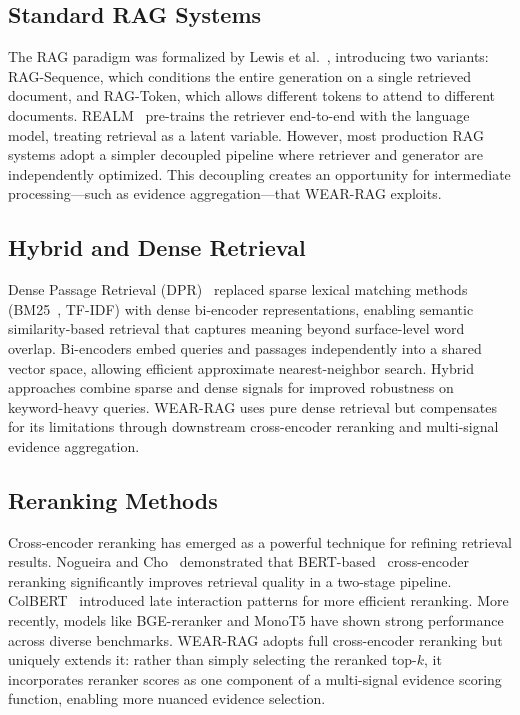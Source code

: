 \documentclass[conference]{IEEEtran}
\begin{document}
\subsection{Standard RAG Systems}
The RAG paradigm was formalized by Lewis et al.~\cite{lewis2020rag}, introducing two variants: RAG-Sequence, which conditions the entire generation on a single retrieved document, and RAG-Token, which allows different tokens to attend to different documents. REALM~\cite{guu2020realm} pre-trains the retriever end-to-end with the language model, treating retrieval as a latent variable. However, most production RAG systems adopt a simpler decoupled pipeline where retriever and generator are independently optimized. This decoupling creates an opportunity for intermediate processing---such as evidence aggregation---that WEAR-RAG exploits.

\subsection{Hybrid and Dense Retrieval}
Dense Passage Retrieval (DPR)~\cite{karpukhin2020dpr} replaced sparse lexical matching methods (BM25~\cite{robertson2009bm25}, TF-IDF) with dense bi-encoder representations, enabling semantic similarity-based retrieval that captures meaning beyond surface-level word overlap. Bi-encoders embed queries and passages independently into a shared vector space, allowing efficient approximate nearest-neighbor search. Hybrid approaches combine sparse and dense signals for improved robustness on keyword-heavy queries. WEAR-RAG uses pure dense retrieval but compensates for its limitations through downstream cross-encoder reranking and multi-signal evidence aggregation.

\subsection{Reranking Methods}
Cross-encoder reranking has emerged as a powerful technique for refining retrieval results. Nogueira and Cho~\cite{nogueira2019passage} demonstrated that BERT-based~\cite{devlin2019bert} cross-encoder reranking significantly improves retrieval quality in a two-stage pipeline. ColBERT~\cite{khattab2020colbert} introduced late interaction patterns for more efficient reranking. More recently, models like BGE-reranker and MonoT5 have shown strong performance across diverse benchmarks. WEAR-RAG adopts full cross-encoder reranking but uniquely extends it: rather than simply selecting the reranked top-$k$, it incorporates reranker scores as one component of a multi-signal evidence scoring function, enabling more nuanced evidence selection.
\end{document}
